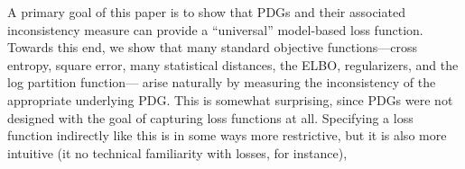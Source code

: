 \documentclass[twoside]{article}
\theoremstyle{plain}
\theoremstyle{definition}
\begin{document}
A primary goal of this paper is to show that PDGs and their associated inconsistency measure can provide a ``universal'' model-based loss function.
Towards this end, we show that many standard objective functions---cross
entropy, square error, many statistical distances, the ELBO,
regularizers, and the log partition function---%
arise naturally by measuring the inconsistency of
the appropriate underlying PDG.
%
This is somewhat surprising, since PDGs were not designed with the
goal of capturing loss functions at all.
Specifying a loss function indirectly like this is in some ways more restrictive,
but it is also more intuitive
(it no technical familiarity with losses, for instance),
\end{document}
